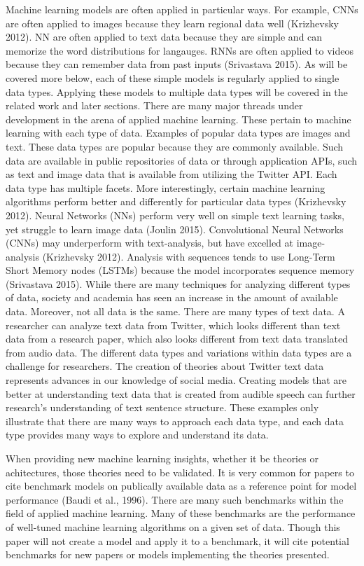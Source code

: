 Machine learning models are often applied in particular ways.  For example, CNNs are often applied to images because they learn regional data well (Krizhevsky 2012).  NN are often applied to text data because they are simple and can memorize the word distributions for langauges.  RNNs are often applied to videos because they can remember data from past inputs (Srivastava 2015).  As will be covered more below, each of these simple models is regularly applied to single data types.  Applying these models to multiple data types will be covered in the related work and later sections.  
There are many major threads under development in the arena of applied machine learning.  These pertain to machine learning with each type of data. Examples of popular data types are images and text. These data types are popular because they are commonly available.  Such data are available in public repositories of data or through application APIs, such as text and image data that is available from utilizing the Twitter API.  Each data type has multiple facets.  More interestingly, certain machine learning algorithms perform better and differently for particular data types (Krizhevsky 2012).  Neural Networks (NNs) perform very well on simple text learning tasks, yet struggle to learn image data (Joulin 2015).  Convolutional Neural Networks (CNNs) may underperform with text-analysis, but have excelled at image-analysis (Krizhevsky 2012).  Analysis with sequences tends to use Long-Term Short Memory nodes (LSTMs) because the model incorporates sequence memory (Srivastava 2015).
While there are many techniques for analyzing different types of data, society and academia has seen an increase in the amount of available data.  Moreover, not all data is the same.  There are many types of text data.  A researcher can analyze text data from Twitter, which looks different than text data from a research paper, which also looks different from text data translated from audio data.  The different data types and variations within data types are a challenge for researchers.  The creation of theories about Twitter text data represents advances in our knowledge of social media.  Creating models that are better at understanding text data that is created from audible speech can further research's understanding of text sentence structure.  These examples only illustrate that there are many ways to approach each data type, and each data type provides many ways to explore and understand its data.

When providing new machine learning insights, whether it be theories or achitectures, those theories need to be validated.  It is very common for papers to cite benchmark models on publically available data as a reference point for model performance (Baudi et al., 1996).  There are many such benchmarks within the field of applied machine learning.  Many of these benchmarks are the performance of well-tuned machine learning algorithms on a given set of data.  Though this paper will not create a model and apply it to a benchmark, it will cite potential benchmarks for new papers or models implementing the theories presented.


